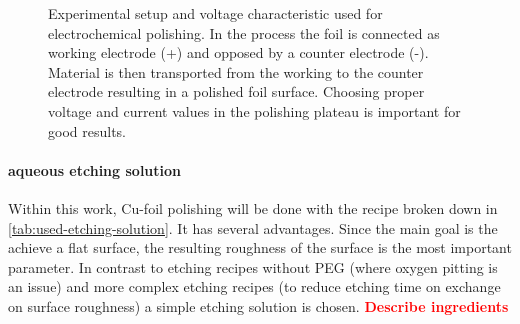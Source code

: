 \begin{figure}\centering
	 \quad%
	\caption{Experimental setup and voltage characteristic used for electrochemical polishing.  In the process the foil is connected as working electrode (+) and opposed by a counter electrode (-). Material is then transported from the working to the counter electrode resulting in a polished foil surface.  Choosing proper voltage and current values in the polishing plateau is important for good results.}
	\label{fig:setup-and-characteristic}
\end{figure}

\paragraph{aqueous etching solution}
Within this work, Cu-foil polishing will be done with the recipe broken down in \autoref{tab:used-etching-solution}. It has several advantages. Since the main goal is the achieve a flat surface, the resulting roughness of the surface is the most important parameter. In contrast to etching recipes without PEG (where oxygen pitting is an issue) and more complex etching recipes (to reduce etching time on exchange on surface roughness) a simple etching solution is chosen.
\textcolor{red}{\textbf{Describe ingredients}}

